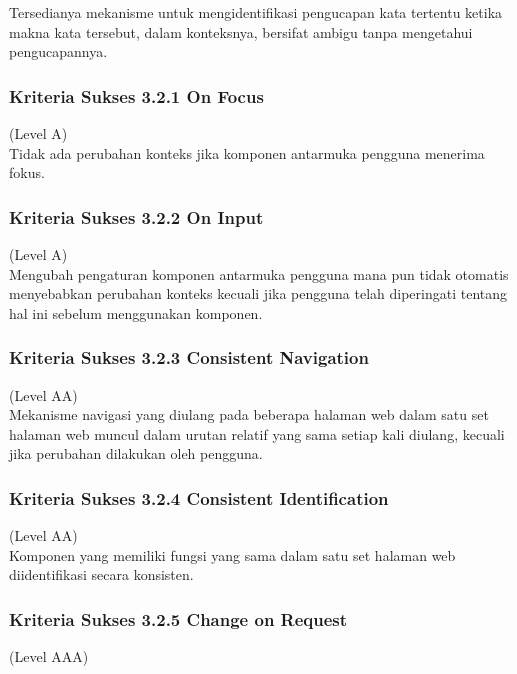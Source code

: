 \documentclass[a4paper,twoside]{article}
\begin{document}
\begin{enumerate}
		Tersedianya mekanisme untuk mengidentifikasi pengucapan kata tertentu ketika makna kata tersebut, dalam konteksnya, bersifat ambigu tanpa mengetahui pengucapannya.
		
		\subsubsection*{Kriteria Sukses 3.2.1 On Focus}
		\label{subsubsec:kriteria_3.2.1}
		(Level A) \\
		
		Tidak ada perubahan konteks jika komponen antarmuka pengguna menerima fokus.
		
		\subsubsection*{Kriteria Sukses 3.2.2 On Input}
		\label{subsubsec:kriteria_3.2.2}
		(Level A) \\
		
		Mengubah pengaturan komponen antarmuka pengguna mana pun tidak otomatis menyebabkan perubahan konteks kecuali jika pengguna telah diperingati tentang hal ini sebelum menggunakan komponen.
		
		\subsubsection*{Kriteria Sukses 3.2.3 Consistent Navigation}
		\label{subsubsec:kriteria_3.2.3}
		(Level AA) \\
		
		Mekanisme navigasi yang diulang pada beberapa halaman web dalam satu set halaman web muncul dalam urutan relatif yang sama setiap kali diulang, kecuali jika perubahan dilakukan oleh pengguna.
		
		\subsubsection*{Kriteria Sukses 3.2.4 Consistent Identification}
		\label{subsubsec:kriteria_3.2.4}
		(Level AA) \\
		
		Komponen yang memiliki fungsi yang sama dalam satu set halaman web diidentifikasi secara konsisten.
		
		\subsubsection*{Kriteria Sukses 3.2.5 Change on Request}
		\label{subsubsec:kriteria_3.2.5}
		(Level AAA) \\
		

\end{enumerate}
\end{document}
